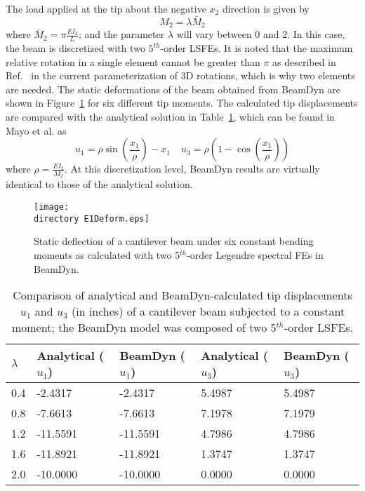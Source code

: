 The load applied at the tip about the negative $x_2$ direction is given by 
\begin{equation}
    \label{E1Load}
    M_2 = \lambda \bar{M}_2
\end{equation}
where $\bar{M}_2 = \pi \frac{EI_2}{L}$; and the parameter $\lambda$ will vary between $0$ and $2$. In 
this case, the beam is discretized with two $5^{th}$-order LSFEs. It is noted that the maximum relative rotation in a single element cannot be greater than $\pi$ as described in Ref.~\cite{Bauchau-etal:2008} in the current parameterization of 3D rotations, which is why two elements are needed. The static deformations of the beam obtained from BeamDyn are shown in
Figure~\ref{E1Deform} for six different tip moments.
The calculated tip displacements are compared with the analytical solution
in Table~\ref{E1u},
which can be found in Mayo et al.\cite{Mayo-etal:2004} as
\begin{equation}
    \label{E1Analytical}
    u_1 = \rho \sin \left( \frac{x_1}{\rho} \right) - x_1~~~~~u_3 = \rho
\left(1-\cos\left(\frac{x_1}{\rho}\right) \right)
\end{equation}
where $\rho = \frac{EI_2}{M_2}$. At this discretization level, BeamDyn results are virtually
identical to those of the analytical solution.

\begin{figure}[h]
    \centering
    \texttt{[image: \\directory E1Deform.eps]}

    \caption{Static deflection of a cantilever beam under six constant
bending moments as calculated with two 5$^{th}$-order Legendre spectral
FEs in BeamDyn.}

    \label{E1Deform}
\end{figure}

\begin{table}[h]
\centering \caption{Comparison of analytical and BeamDyn-calculated tip
displacements $u_1$ and $u_3$ (in inches) of a cantilever beam subjected to a constant moment; the BeamDyn model was composed of two 5$^{th}$-order LSFEs.}
\label{E1u} 
	\begin{tabular}{| l | l | l | l | l | }
    	\hline
    	$\lambda$ & Analytical ($u_1$) & BeamDyn ($u_1$) & Analytical ($u_3$) & BeamDyn ($u_3$)  
	\\ \hline
    	0.4       & -2.4317    & -2.4317  & 5.4987     & 5.4987
	\\ \hline
    	0.8       & -7.6613    & -7.6613  & 7.1978     & 7.1979
	\\ \hline
    	1.2       & -11.5591   & -11.5591 & 4.7986     & 4.7986
	\\ \hline
    	1.6       & -11.8921   & -11.8921 & 1.3747     & 1.3747
	\\ \hline
    	2.0       & -10.0000   & -10.0000 & 0.0000     & 0.0000
	\\ \hline
    \end{tabular}
\end{table}

